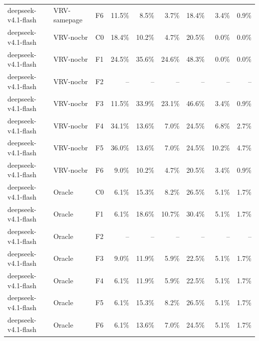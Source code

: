 \begin{tabular}{lllrrrrrr}
deepseek-v4.1-flash & VRV-samepage & F6 & 11.5\% & 8.5\% & 3.7\% & 18.4\% & 3.4\% & 0.9\% \\
deepseek-v4.1-flash & VRV-nocbr & C0 & 18.4\% & 10.2\% & 4.7\% & 20.5\% & 0.0\% & 0.0\% \\
deepseek-v4.1-flash & VRV-nocbr & F1 & 24.5\% & 35.6\% & 24.6\% & 48.3\% & 0.0\% & 0.0\% \\
deepseek-v4.1-flash & VRV-nocbr & F2 & -- & -- & -- & -- & -- & -- \\
deepseek-v4.1-flash & VRV-nocbr & F3 & 11.5\% & 33.9\% & 23.1\% & 46.6\% & 3.4\% & 0.9\% \\
deepseek-v4.1-flash & VRV-nocbr & F4 & 34.1\% & 13.6\% & 7.0\% & 24.5\% & 6.8\% & 2.7\% \\
deepseek-v4.1-flash & VRV-nocbr & F5 & 36.0\% & 13.6\% & 7.0\% & 24.5\% & 10.2\% & 4.7\% \\
deepseek-v4.1-flash & VRV-nocbr & F6 & 9.0\% & 10.2\% & 4.7\% & 20.5\% & 3.4\% & 0.9\% \\
deepseek-v4.1-flash & Oracle & C0 & 6.1\% & 15.3\% & 8.2\% & 26.5\% & 5.1\% & 1.7\% \\
deepseek-v4.1-flash & Oracle & F1 & 6.1\% & 18.6\% & 10.7\% & 30.4\% & 5.1\% & 1.7\% \\
deepseek-v4.1-flash & Oracle & F2 & -- & -- & -- & -- & -- & -- \\
deepseek-v4.1-flash & Oracle & F3 & 9.0\% & 11.9\% & 5.9\% & 22.5\% & 5.1\% & 1.7\% \\
deepseek-v4.1-flash & Oracle & F4 & 6.1\% & 11.9\% & 5.9\% & 22.5\% & 5.1\% & 1.7\% \\
deepseek-v4.1-flash & Oracle & F5 & 6.1\% & 15.3\% & 8.2\% & 26.5\% & 5.1\% & 1.7\% \\
deepseek-v4.1-flash & Oracle & F6 & 6.1\% & 13.6\% & 7.0\% & 24.5\% & 5.1\% & 1.7\% \\
\bottomrule
\end{tabular}

